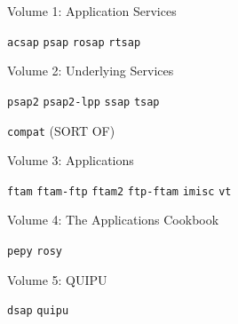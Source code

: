 \begin{bwslide}

\begin{nrtc}
\item	Volume 1: Application Services\\
    \begin{nrtc}
    \item	\verb"acsap" \verb"psap" \verb"rosap" \verb"rtsap" 
    \end{nrtc}

\item	Volume 2: Underlying Services\\
    \begin{nrtc}
    \item	\verb"psap2" \verb"psap2-lpp" \verb"ssap" \verb"tsap"

    \item	\verb"compat" (SORT OF)
    \end{nrtc}

\item	Volume 3: Applications\\
    \begin{nrtc}
    \item	\verb"ftam" \verb"ftam-ftp" \verb"ftam2" \verb"ftp-ftam"
		\verb"imisc" \verb"vt"
    \end{nrtc}

\item	Volume 4: The Applications Cookbook\\
    \begin{nrtc}
    \item	\verb"pepy" \verb"rosy"
    \end{nrtc}

\item	Volume 5: QUIPU\\
    \begin{nrtc}
    \item	\verb"dsap" \verb"quipu"
    \end{nrtc}
\end{nrtc}
\end{bwslide}


